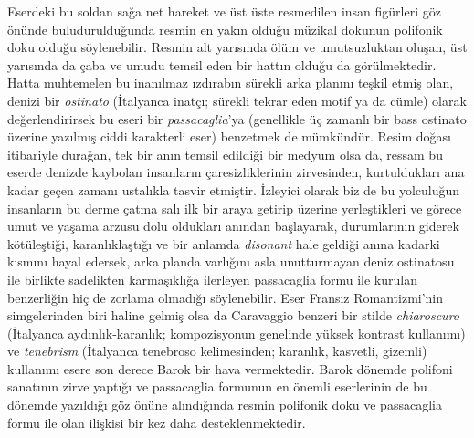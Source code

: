 \documentclass{report}
\begin{document}
Eserdeki bu soldan sağa net hareket ve üst üste resmedilen insan figürleri göz önünde buludurulduğunda resmin en yakın olduğu müzikal dokunun polifonik doku olduğu söylenebilir.
Resmin alt yarısında ölüm ve umutsuzluktan oluşan, üst yarısında da çaba ve umudu temsil eden bir hattın olduğu da görülmektedir.
Hatta muhtemelen bu inanılmaz ızdırabın sürekli arka planını teşkil etmiş olan, denizi bir \textit{ostinato} (İtalyanca inatçı; sürekli tekrar eden motif ya da cümle) olarak değerlendirirsek bu eseri bir \textit{passacaglia}'ya (genellikle üç zamanlı bir bass ostinato üzerine yazılmış ciddi karakterli eser) benzetmek de mümkündür.
Resim doğası itibariyle durağan, tek bir anın temsil edildiği bir medyum olsa da, ressam bu eserde denizde kaybolan insanların çaresizliklerinin zirvesinden, kurtuldukları ana kadar geçen zamanı ustalıkla tasvir etmiştir.
İzleyici olarak biz de bu yolculuğun insanların bu derme çatma salı ilk bir araya getirip üzerine yerleştikleri ve görece umut ve yaşama arzusu dolu oldukları anından başlayarak, durumlarının giderek kötüleştiği, karanlıklaştığı ve bir anlamda \textit{disonant} hale geldiği anına kadarki kısmını hayal edersek, arka planda varlığını asla unutturmayan deniz ostinatosu ile birlikte sadelikten karmaşıklığa ilerleyen passacaglia formu ile kurulan benzerliğin hiç de zorlama olmadığı söylenebilir.
Eser Fransız Romantizmi'nin simgelerinden biri haline gelmiş olsa da Caravaggio benzeri bir stilde \textit{chiaroscuro} (İtalyanca aydınlık-karanlık; kompozisyonun genelinde yüksek kontrast kullanımı) ve \textit{tenebrism} (İtalyanca tenebroso kelimesinden; karanlık, kasvetli, gizemli) kullanımı esere son derece Barok bir hava vermektedir.
Barok dönemde polifoni sanatının zirve yaptığı ve passacaglia formunun en önemli eserlerinin de bu dönemde yazıldığı göz önüne alındığında resmin polifonik doku ve passacaglia formu ile olan ilişkisi bir kez daha desteklenmektedir.



\end{document}
